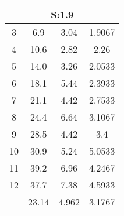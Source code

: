 
	\begin{table}[H]
		\begin{tabular}{c|ccc}
			\multicolumn{4}{c}{S:1.9}\\\hline
			3 & 6.9 & 3.04 & 1.9067\\
			4 & 10.6 & 2.82 & 2.26\\
			5 & 14.0 & 3.26 & 2.0533\\
			6 & 18.1 & 5.44 & 2.3933\\
			7 & 21.1 & 4.42 & 2.7533\\
			8 & 24.4 & 6.64 & 3.1067\\
			9 & 28.5 & 4.42 & 3.4\\
			10 & 30.9 & 5.24 & 5.0533\\
			11 & 39.2 & 6.96 & 4.2467\\
			12 & 37.7 & 7.38 & 4.5933\\
			\hline
			& 23.14 & 4.962 & 3.1767\\
		\end{tabular}
	\end{table}